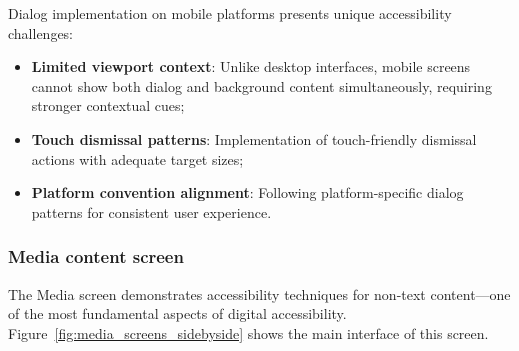 Dialog implementation on mobile platforms presents unique accessibility challenges:

\begin{itemize}
    \item \textbf{Limited viewport context}: Unlike desktop interfaces, mobile screens cannot show both dialog and background content simultaneously, requiring stronger contextual cues;
    
    \item \textbf{Touch dismissal patterns}: Implementation of touch-friendly dismissal actions with adequate target sizes;
    
    \item \textbf{Platform convention alignment}: Following platform-specific dialog patterns for consistent user experience.
\end{itemize}

\subsubsection{Media content screen}
\label{subsubsec:media-screen}

The Media screen demonstrates accessibility techniques for non-text content—one of the most fundamental aspects of digital accessibility.
Figure~\ref{fig:media_screens_sidebyside} shows the main interface of this screen.

